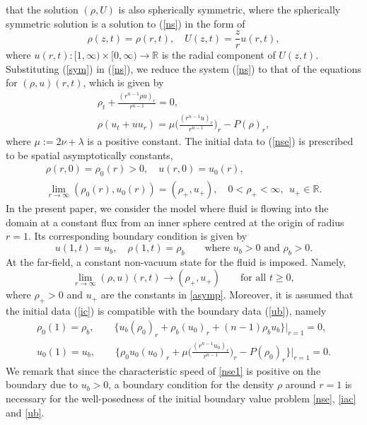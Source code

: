 \documentclass[a4paper,12pt,draft]{article}
\theoremstyle{remark}
\def\R{\mathbb{R}}
\begin{document}
\cite{itaya85} that
the solution $(\rho, U)$ is also spherically symmetric, where the spherically symmetric solution is a solution to (\ref{ns}) in the form of
\begin{equation}
\rho(z,t) = \rho(r,t), \quad U(z,t) = \frac{z}{r} u(r,t),
\label{sym}
\end{equation}
where $u(r,t):[1,\infty)\times [0,\infty)\to \R$ is the radial component of $U(z,t)$.
Substituting (\ref{sym}) in (\ref{ns}), we reduce the system (\ref{ns}) to that of the equations for $(\rho, u)(r,t)$, which is given by 
\begin{subequations}
\label{nse}
\begin{gather}
\rho_t + \frac{(r^{n-1} \rho u)_r}{r^{n-1}} = 0, \label{nse1} \\
\rho (u_t + uu_r) = \mu \Big( \frac{(r^{n-1} u)_r}{r^{n-1}}
\Big)_r
- P(\rho)_r, \label{nse2}
\end{gather}
\end{subequations}
where $\mu := 2\nu + \lambda $ is a positive constant.
 The initial data
to (\ref{nse})
is prescribed to be spatial
asymptotically constants,
\begin{subequations}
\label{iac}
\begin{gather}
\rho(r,0) = \rho_0(r)>0, \quad u(r,0) = u_0(r), \label{ic}\\
\lim_{r \to \infty} (\rho_0(r), u_0(r)) = (\rho_+, u_+), \quad 0<\rho_+ <\infty, \ \ u_+\in\R. \label{asymp}
\end{gather}
\end{subequations}
In the present paper, we consider the model where fluid is flowing into the domain at a constant flux from an inner sphere centred at the origin of radius $r=1$. Its corresponding boundary condition is given by
\begin{equation}\label{ub}
 u(1,t) = u_b, \quad \rho(1,t)= \rho_b \qquad  \text{where $u_b>0$ and $\rho_b>0$.} 
\end{equation}
At the far-field, a constant non-vacuum state for the fluid is imposed. Namely,
\begin{equation}\label{ffc}
\lim\limits_{r\to \infty}(\rho,u)(r,t) \to (\rho_+,u_+) \qquad \text{for all }  t\ge 0,
\end{equation}
where $\rho_+>0$ and $u_+$ are the constants in \eqref{asymp}. Moreover, it is assumed that the initial data (\ref{ic}) is compatible with the boundary data (\ref{ub}), namely
\begin{subequations}\label{compa}
\begin{gather} 
\rho_0(1)=\rho_b, \qquad \big\{ u_b (\rho_0)_r + \rho_b (u_0)_r + (n-1) \rho_b u_b \big\}\big\vert_{r=1}=0,  \label{compa1} \\ 
u_0(1) = u_b, \qquad \Big\{ \rho_0 u_0 (u_0)_r + \mu \Big( \frac{(r^{n-1}u_0)_r}{r^{n-1}}\Big)_r - P(\rho_0)_r \Big\} \bigg|_{r=1} = 0. \label{compa2}
\end{gather}
\end{subequations}
We remark that since the characteristic speed of \eqref{nse1} is positive on the boundary due to $u_b>0$, a boundary condition for the density $\rho$ around $r=1$ is necessary for the well-posedness of the initial boundary value problem \eqref{nse}, \eqref{iac} and \eqref{ub}.
\end{document}
